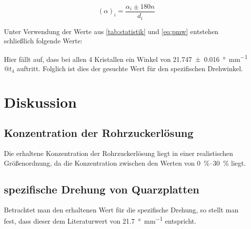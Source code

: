 \documentclass[11pt,ngerman]{scrartcl}
\begin{document}
\begin{equation}
	(\alpha)_i = \frac{\alpha_i \pm 180 n}{d_i}
	\label{eq:pmw}
\end{equation}

Unter Verwendung der Werte aus \autoref{tab:statistik} und \autoref{eq:pmw}
entstehen schließlich folgende Werte:

\begin{table}[H]
	\caption{erhaltene Winkel für die fortlaufenden Indizes \\ $n \dots$ erhaltener Wert für laufenden Index samt Unsicherheit\\ $Q_1 \dots$ Quarzkristalls 1\\ $Q_2 \dots$ Quarzkristalls 2\\ $Q_3 \dots$ Quarzkristalls 3\\ $Q_4 \dots$ Quarzkristalls 4}
	\centering
	
	\label{tab:letztes}
\end{table}

Hier fällt auf, dass bei allen 4 Kristallen ein Winkel von
\SI{21.747(16)}{\degree\per\mm}$@t_4$ auftritt. Folglich ist dies der gesuchte Wert
für den spezifischen Drehwinkel.

\newpage

\section{Diskussion}\label{disk}


\subsection{Konzentration der Rohrzuckerlösung}

Die erhaltene Konzentration der Rohrzuckerlösung liegt in einer realistischen
Größenordnung, da die Konzentration zwischen den Werten von \SIrange{0}{30}{\percent}
liegt. \cite{vorlagehalbschatten}


\subsection{spezifische Drehung von Quarzplatten}

Betrachtet man den erhaltenen Wert für die spezifische Drehung, so stellt man
fest, dass dieser dem Literaturwert von \SI{21.7}{\degree\per\mm} \cite{hecht2017optics}
entspricht.

\vspace{2mm}
\end{document}
